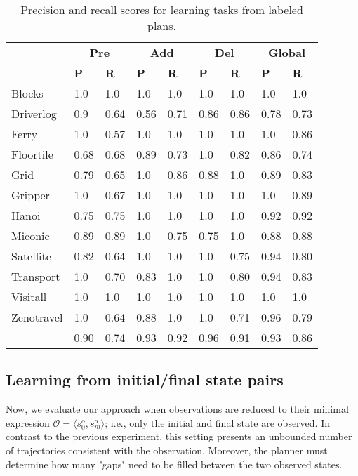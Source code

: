 \documentclass[runningheads]{llncs}
\newcommand{\tup}[1]{{\langle #1 \rangle}}
\begin{document}
\begin{table}[h]
	\begin{center}
		\begin{tabular}{l|*{6}{p{1cm}|}|*{2}{p{1cm}|}}
			& \multicolumn{2}{c|}{\bf Pre} & \multicolumn{2}{c|}{\bf Add} & \multicolumn{2}{c||}{\bf Del} & \multicolumn{2}{c}{\bf Global}\\ \cline{2-9}			
			& {\bf P} & {\bf R} &{\bf P} & {\bf R} & {\bf P} & {\bf R} &  {\bf P} & {\bf R} \\
			\hline
			Blocks & 1.0 & 1.0 & 1.0 & 1.0 & 1.0 & 1.0 & 1.0 & 1.0\\
			Driverlog & 0.9 & 0.64 & 0.56 & 0.71 & 0.86 & 0.86 & 0.78 & 0.73\\
			Ferry & 1.0 & 0.57 & 1.0 & 1.0 & 1.0 & 1.0 & 1.0 & 0.86\\
			Floortile & 0.68 & 0.68 & 0.89 & 0.73 & 1.0 & 0.82 & 0.86 & 0.74\\
			Grid & 0.79 & 0.65 & 1.0 & 0.86 & 0.88 & 1.0 & 0.89 & 0.83 \\
			Gripper & 1.0 & 0.67 & 1.0 & 1.0 & 1.0 & 1.0 & 1.0 & 0.89\\
			Hanoi & 0.75 & 0.75 & 1.0 & 1.0 & 1.0 & 1.0 & 0.92 & 0.92\\
			Miconic & 0.89 & 0.89 & 1.0 & 0.75 & 0.75 & 1.0 & 0.88 & 0.88\\
			Satellite & 0.82 & 0.64 & 1.0 & 1.0 & 1.0 & 0.75 & 0.94 & 0.80\\
			Transport & 1.0 & 0.70 & 0.83 & 1.0 & 1.0 & 0.80 & 0.94 & 0.83\\
			Visitall & 1.0 & 1.0 & 1.0 & 1.0 & 1.0 & 1.0 & 1.0 & 1.0\\
			Zenotravel & 1.0 & 0.64 & 0.88 & 1.0 & 1.0 & 0.71 & 0.96 & 0.79\\
			\hline
			\bf  & 0.90 & 0.74 & 0.93 & 0.92 & 0.96 & 0.91 & 0.93 & 0.86\\
		\end{tabular}	
	\end{center}
	\caption{Precision and recall scores for learning tasks from labeled plans.}
	\label{tab:results_plans}
\end{table}

\subsection{Learning from initial/final state pairs}
Now, we evaluate our approach when observations are reduced to their minimal expression $\mathcal{O}=\tup{s_0^o,s_m^o}$; i.e., only the initial and final state are observed. In contrast to the previous experiment, this setting presents an unbounded number of trajectories consistent with the observation. Moreover, the planner must determine how many "gaps" need to be filled between the two observed states.
\end{document}
